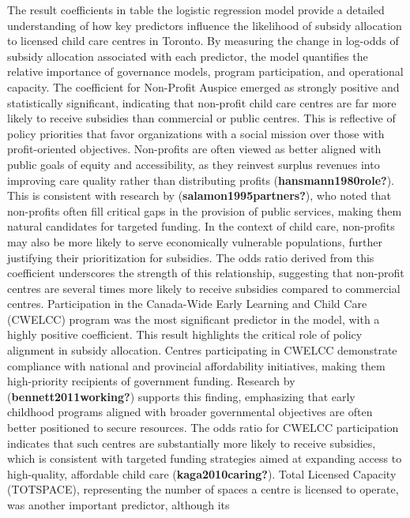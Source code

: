\documentclass[
  letterpaper,
  DIV=11,
  numbers=noendperiod]{scrartcl}
\begin{document}
The result coefficients in table the logistic regression model provide a
detailed understanding of how key predictors influence the likelihood of
subsidy allocation to licensed child care centres in Toronto. By
measuring the change in log-odds of subsidy allocation associated with
each predictor, the model quantifies the relative importance of
governance models, program participation, and operational capacity. The
coefficient for Non-Profit Auspice emerged as strongly positive and
statistically significant, indicating that non-profit child care centres
are far more likely to receive subsidies than commercial or public
centres. This is reflective of policy priorities that favor
organizations with a social mission over those with profit-oriented
objectives. Non-profits are often viewed as better aligned with public
goals of equity and accessibility, as they reinvest surplus revenues
into improving care quality rather than distributing profits
(\textbf{hansmann1980role?}). This is consistent with research by
(\textbf{salamon1995partners?}), who noted that non-profits often fill
critical gaps in the provision of public services, making them natural
candidates for targeted funding. In the context of child care,
non-profits may also be more likely to serve economically vulnerable
populations, further justifying their prioritization for subsidies. The
odds ratio derived from this coefficient underscores the strength of
this relationship, suggesting that non-profit centres are several times
more likely to receive subsidies compared to commercial centres.
Participation in the Canada-Wide Early Learning and Child Care (CWELCC)
program was the most significant predictor in the model, with a highly
positive coefficient. This result highlights the critical role of policy
alignment in subsidy allocation. Centres participating in CWELCC
demonstrate compliance with national and provincial affordability
initiatives, making them high-priority recipients of government funding.
Research by (\textbf{bennett2011working?}) supports this finding,
emphasizing that early childhood programs aligned with broader
governmental objectives are often better positioned to secure resources.
The odds ratio for CWELCC participation indicates that such centres are
substantially more likely to receive subsidies, which is consistent with
targeted funding strategies aimed at expanding access to high-quality,
affordable child care (\textbf{kaga2010caring?}). Total Licensed
Capacity (TOTSPACE), representing the number of spaces a centre is
licensed to operate, was another important predictor, although its
\end{document}
